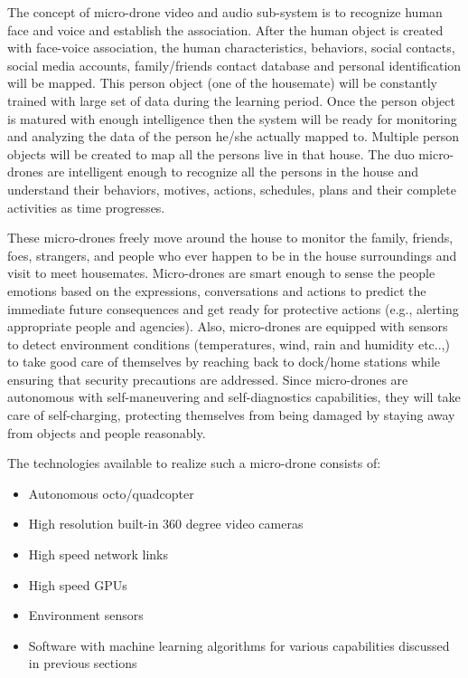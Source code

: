 \documentclass[sigconf]{acmart}
\begin{document}
The concept of micro-drone video and audio sub-system is to recognize human face and voice and establish the association. After the human object is created with face-voice association, the human characteristics, behaviors, social contacts, social media accounts, family/friends contact database and personal identification will be mapped. This person object (one of the housemate) will be constantly trained with large set of data during the learning period. Once the person object is matured with enough intelligence then the system will be ready for monitoring and analyzing the data of the person he/she actually mapped to. Multiple person objects will be created to map all the persons live in that house. The duo micro-drones are intelligent enough to recognize all the persons in the house and understand their behaviors, motives, actions, schedules, plans and their complete activities as time progresses.  

These micro-drones freely move around the house to monitor the family, friends, foes, strangers, and people who ever happen to be in the house surroundings and visit to meet housemates. Micro-drones are smart enough to sense the people emotions based on the expressions, conversations and actions to predict the immediate future consequences and get ready for protective actions (e.g., alerting appropriate people and agencies). Also, micro-drones are equipped with sensors to detect environment conditions (temperatures, wind, rain and humidity etc..,) to take good care of themselves by reaching back to dock/home stations while ensuring that security precautions are addressed. 
Since micro-drones are autonomous with self-maneuvering and self-diagnostics capabilities, they will take care of self-charging, protecting themselves from being damaged by staying away from objects and people reasonably.

The technologies available to realize such a micro-drone consists of: 
\begin{itemize}
  \item Autonomous octo/quadcopter 
  \item High resolution built-in 360 degree video cameras 
  \item High speed network links
  \item High speed GPUs
  \item Environment sensors
  \item Software with machine learning algorithms for various capabilities discussed in previous sections
\end{itemize}
\end{document}
